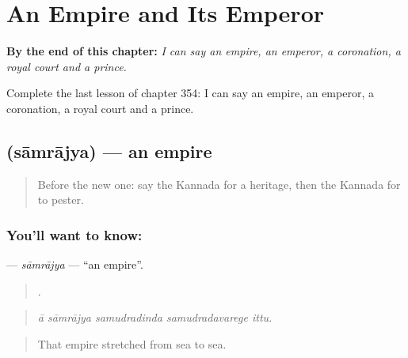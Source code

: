 
\chapter{An Empire and Its Emperor}
\label{ch:ka-an-empire-and-its-emperor}

\begin{chapteropening}
\textbf{By the end of this chapter:} \emph{I can say an empire, an emperor, a coronation, a royal court and a prince.}

Complete the last lesson of chapter 354: I can say an empire, an emperor, a coronation, a royal court and a prince.
\end{chapteropening}

\section[\texorpdfstring{\kn{ಸಾಮ್ರಾಜ್ಯ} (sāmrājya)}{ಸಾಮ್ರಾಜ್ಯ (sāmrājya)}]{ (sāmrājya) — an empire}

\label{lesson:KA-C354-samrajya}



\begin{quote}
Before the new one: say the Kannada for a heritage, then the Kannada for to pester.
\end{quote}

\subsection*{You'll want to know: }
\textbf{} — \emph{sāmrājya} — \textquotedblleft{}an empire\textquotedblright{}.

\begin{quote}
    .
\end{quote}

\begin{quote}
\emph{ā sāmrājya samudradinda samudradavarege ittu.}
\end{quote}

\begin{quote}
That empire stretched from sea to sea.
\end{quote}

